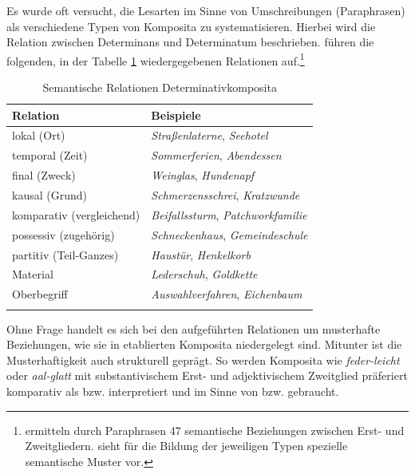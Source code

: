 Es wurde oft versucht, die Lesarten im Sinne von Umschreibungen (Paraphrasen) als verschiedene Typen von Komposita zu systematisieren. Hierbei wird die Relation zwischen Determinans und Determinatum beschrieben. \citet[141]{FleischerBarz2012} führen die folgenden, in der Tabelle \ref{tab:DeterminantivkompositaRel} wiedergegebenen Relationen auf.\footnote{\citet[133--139]{OrtnerOrtner1984} ermitteln durch Paraphrasen 47 semantische Beziehungen zwischen Erst- und Zweitgliedern. \citet[7]{Motsch2004} sieht für die Bildung der jeweiligen Typen spezielle semantische Muster vor.}

\begin{table}[!htbp]
  \centering
  \begin{tabular}{l l}
    \lsptoprule
    Relation & Beispiele \\
    \hline
    lokal (Ort) & \textit{Straßenlaterne}, \textit{Seehotel}\\
    
    temporal (Zeit) & \textit{Sommerferien}, \textit{Abendessen}\\
    
    final (Zweck) & \textit{Weinglas}, \textit{Hundenapf}\\

    kausal (Grund) &\textit{Schmerzensschrei}, \textit{Kratzwunde}\\

    komparativ (vergleichend) & \textit{Beifallssturm}, \textit{Patchworkfamilie}\\ 
    
    possessiv (zugehörig) & \textit{Schneckenhaus}, \textit{Gemeindeschule}\\
    
    partitiv (Teil-Ganzes) & \textit{Haustür}, \textit{Henkelkorb}\\ 
    
    Material & \textit{Lederschuh}, \textit{Goldkette}\\ 

    Oberbegriff & \textit{Auswahlverfahren}, \textit{Eichenbaum}\\ 

    \lspbottomrule 
  \end{tabular}
  \caption{Semantische Relationen Determinativkomposita}
  \label{tab:DeterminantivkompositaRel}
\end{table}

Ohne Frage handelt es sich bei den aufgeführten Relationen um musterhafte Beziehungen, wie sie in etablierten Komposita niedergelegt sind. Mitunter ist die Musterhaftigkeit auch strukturell geprägt. So werden Komposita wie \textit{feder-leicht} oder \textit{aal-glatt} mit substantivischem Erst- und adjektivischem Zweitglied präferiert komparativ als  bzw.  interpretiert und im Sinne von  bzw.  gebraucht. 

